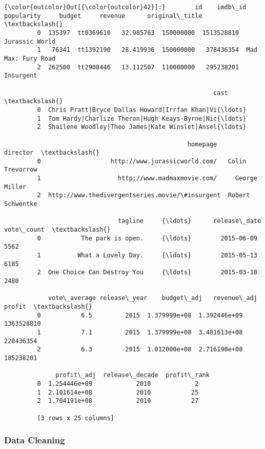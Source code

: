 \documentclass[11pt]{article}
\begin{document}
\begin{Verbatim}[commandchars=\\\{\}]
{\color{outcolor}Out[{\color{outcolor}42}]:}        id    imdb\_id  popularity     budget     revenue      original\_title  \textbackslash{}
         0  135397  tt0369610   32.985763  150000000  1513528810      Jurassic World   
         1   76341  tt1392190   28.419936  150000000   378436354  Mad Max: Fury Road   
         2  262500  tt2908446   13.112507  110000000   295238201           Insurgent   
         
                                                         cast  \textbackslash{}
         0  Chris Pratt|Bryce Dallas Howard|Irrfan Khan|Vi{\ldots}   
         1  Tom Hardy|Charlize Theron|Hugh Keays-Byrne|Nic{\ldots}   
         2  Shailene Woodley|Theo James|Kate Winslet|Ansel{\ldots}   
         
                                                  homepage          director  \textbackslash{}
         0                   http://www.jurassicworld.com/   Colin Trevorrow   
         1                     http://www.madmaxmovie.com/     George Miller   
         2  http://www.thedivergentseries.movie/\#insurgent  Robert Schwentke   
         
                               tagline     {\ldots}      release\_date vote\_count  \textbackslash{}
         0           The park is open.     {\ldots}        2015-06-09       5562   
         1          What a Lovely Day.     {\ldots}        2015-05-13       6185   
         2  One Choice Can Destroy You     {\ldots}        2015-03-18       2480   
         
            vote\_average release\_year    budget\_adj   revenue\_adj      profit  \textbackslash{}
         0           6.5         2015  1.379999e+08  1.392446e+09  1363528810   
         1           7.1         2015  1.379999e+08  3.481613e+08   228436354   
         2           6.3         2015  1.012000e+08  2.716190e+08   185238201   
         
              profit\_adj  release\_decade  profit\_rank  
         0  1.254446e+09            2010            2  
         1  2.101614e+08            2010           25  
         2  1.704191e+08            2010           27  
         
         [3 rows x 25 columns]
\end{Verbatim}
            
    \hypertarget{data-cleaning}{%
\subsubsection{Data Cleaning}\label{data-cleaning}}
\end{document}

